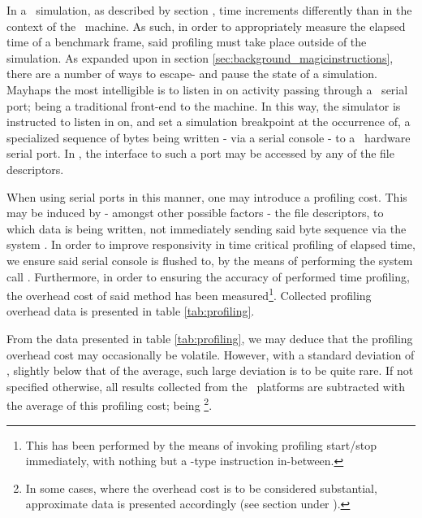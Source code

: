 In a \dvttermsimics\ simulation, as described by section , time increments differently than in the context of the \dvttermhost\ machine.
As such, in order to appropriately measure the elapsed time of a benchmark frame, said profiling must take place outside of the simulation.
As expanded upon in section \ref{sec:background_magicinstructions}, there are a number of ways to escape- and pause the state of a simulation.
Mayhaps the most intelligible is to listen in on activity passing through a \dvttermtarget\ serial port; being a traditional front-end to the machine.
In this way, the simulator is instructed to listen in on, and set a simulation breakpoint at the occurrence of, a specialized sequence of bytes being written - via a serial console - to a \dvttermuart\ hardware serial port.
In \dvttermlinux , the interface to such a port may be accessed by any of the  file descriptors.


When using serial ports in this manner, one may introduce a profiling cost.
This may be induced by - amongst other possible factors - the file descriptors, to which data is being written, not immediately sending said byte sequence via the system \dvttermuart .
In order to improve responsivity in time critical profiling of elapsed time, we ensure said serial console is flushed to, by the means of performing the system call .
Furthermore, in order to ensuring the accuracy of performed time profiling, the overhead cost of said method has been measured\footnote{This has been performed by the means of invoking profiling start/stop immediately, with nothing but a -type instruction in-between.}.
Collected profiling overhead data is presented in table \ref{tab:profiling}.



From the data presented in table \ref{tab:profiling}, we may deduce that the profiling overhead cost may occasionally be volatile.
However, with a standard deviation of , slightly below that of the average, such large deviation is to be quite rare.
If not specified otherwise, all results collected from the \dvttermsimics\ platforms are subtracted with the average of this profiling cost; being \footnote{In some cases, where the overhead cost is to be considered substantial, approximate data is presented accordingly (see section  under ).}.\\

